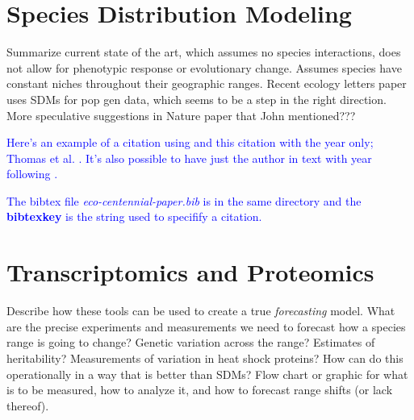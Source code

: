 \documentclass{article}
\newcommand{\Jtxt}[1]{\textcolor{blue}{#1}}
\newcommand{\Jcom}[1]{\textsc {\textcolor{blue}{#1}}}
\newcommand{\Ncom}[1]{\textsc {\textcolor{red}{#1}}}
\begin{document}
\begin{abstract}
\Ncom{Hi John. In the spirit of \LaTeX WYSIWYM writing, I suggest we postpone formatting until near the very end.}

Instead, let's get some text developed and start populating the bibliography. I have set up 4 new commands that act like a poor man's track changes. When you want to add or edit something, just copy the entire paragraph, bracket it with Jtex \Jtxt{edited text here} and make your edits. If you are making comments, use Jcom \Jcom{comments here}. Your comments and edits will show up in blue, and mine will show up in red. Each round of changes, I will be adding red text. When you get it, you can accept changes and decolorize the red, then add your own new material (text, edits, comments). This is how we used to do it with highlighting in the days before track changes. Let's see how it works.
 
\Ncom{Can you look into how to set up a bibliography in Gummi? Thanks!}
\Jcom{Done! See below}

\end{abstract}
\section*{Species Distribution Modeling}

Summarize current state of the art, which assumes no species interactions, does not allow for phenotypic response or evolutionary change. Assumes species have constant niches throughout their geographic ranges. Recent ecology letters paper uses SDMs for pop gen data, which seems to be a step in the right direction. More speculative suggestions in Nature paper that John mentioned???

\Jtxt{Here's an example of a citation using \parencite{ettinger_climate_2013} and this citation with the year only; Thomas et al. \parencite*{thomas_extinction_2004}. It's also possible to have just the author in text with year following   \textcite{aitken_assisted_2013}. }

 \Jtxt{The bibtex file \emph{eco-centennial-paper.bib} is in the same directory and the \textbf{bibtexkey} is the string used to specifify a citation.}

\section*{Transcriptomics and Proteomics}
Describe how these tools can be used to create a true \emph{forecasting} model. What are the precise experiments and measurements we need to forecast how a species range is going to change? Genetic variation across the range? Estimates of heritability? Measurements of variation in heat shock proteins? How can do this operationally in a way that is better than SDMs? Flow chart or graphic for what is to be measured, how to analyze it, and how to forecast range shifts (or lack thereof).
\end{document}
